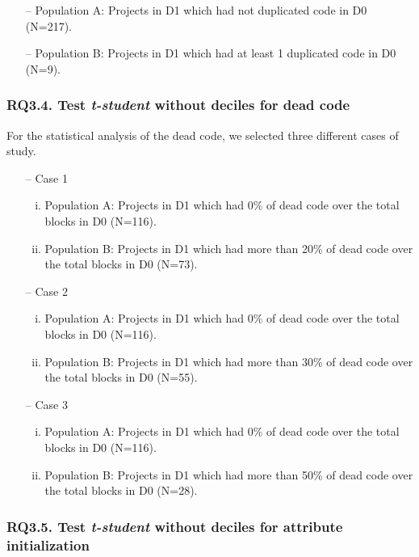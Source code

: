 \begin{itemize}
    \item[--] Population A: Projects in D1 which had not duplicated code in D0 (N=217).
    \item[--] Population B: Projects in D1 which had at least 1 duplicated code in D0 (N=9).
\end{itemize}


\subsubsection{RQ3.4. Test \textit{t-student} without deciles for dead code}
\label{subsubsec:RQ3_4_statistical}

For the statistical analysis of the dead code, we selected three different cases of study.

\begin{itemize}
    \item[--] Case 1
    \begin{enumerate}[(i)]
        \item Population A: Projects in D1 which had 0\% of dead code over the total blocks in D0 (N=116).
        \item Population B: Projects in D1 which had more than 20\% of dead code over the total blocks in D0 (N=73).
    \end{enumerate}
    \item[--] Case 2
    \begin{enumerate}[(i)]
        \item Population A: Projects in D1 which had 0\% of dead code over the total blocks in D0 (N=116).
        \item Population B: Projects in D1 which had more than 30\% of dead code over the total blocks in D0 (N=55).
    \end{enumerate}
    \item[--] Case 3
    \begin{enumerate}[(i)]
        \item Population A: Projects in D1 which had 0\% of dead code over the total blocks in D0 (N=116).
        \item Population B: Projects in D1 which had more than 50\% of dead code over the total blocks in D0 (N=28).
    \end{enumerate}
\end{itemize}


\subsubsection{RQ3.5. Test \textit{t-student} without deciles for attribute initialization}
\label{subsubsec:RQ3_5_statistical}

